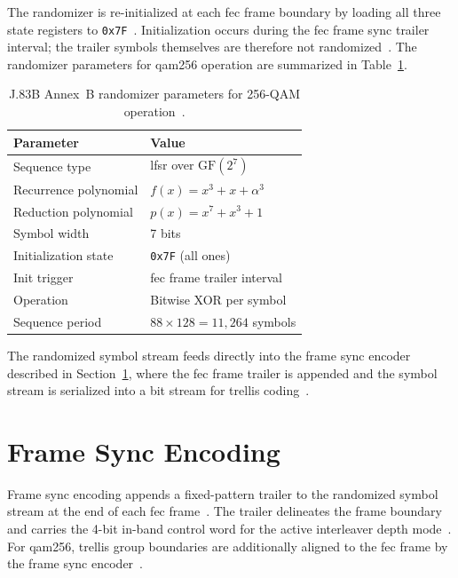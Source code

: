 The randomizer is re-initialized at each \ac{fec} frame boundary
by loading all three state registers to \texttt{0x7F}~\cite{ITU_J83}.
Initialization occurs during the \ac{fec} frame sync trailer
interval; the trailer symbols themselves are therefore not
randomized~\cite{ITU_J83}.
The randomizer parameters for \ac{qam256} operation are summarized
in Table~\ref{tab:rand_params}.

\begin{table}[htbp]
  \caption{J.83B Annex~B randomizer parameters for
           256-QAM operation~\cite{ITU_J83}.}
  \label{tab:rand_params}
  \centering
  \begin{tabular}{ll}
    \hline
    Parameter              & Value \\
    \hline
    Sequence type          & \ac{lfsr} over $\mathrm{GF}(2^7)$ \\
    Recurrence polynomial  & $f(x) = x^3 + x + \alpha^3$ \\
    Reduction polynomial   & $p(x) = x^7 + x^3 + 1$ \\
    Symbol width           & 7 bits \\
    Initialization state   & \texttt{0x7F} (all ones) \\
    Init trigger           & \ac{fec} frame trailer interval \\
    Operation              & Bitwise XOR per symbol \\
    Sequence period        & $88 \times 128 = 11{,}264$ symbols \\
    \hline
  \end{tabular}
\end{table}

The randomized symbol stream feeds directly into the frame sync
encoder described in Section~\ref{sec:framesync}, where the
\ac{fec} frame trailer is appended and the symbol stream is
serialized into a bit stream for trellis coding~\cite{ITU_J83}.


\section{Frame Sync Encoding}
\label{sec:framesync}

Frame sync encoding appends a fixed-pattern trailer to the
randomized symbol stream at the end of each \ac{fec}
frame~\cite{ITU_J83}.
The trailer delineates the frame boundary and carries the 4-bit
in-band control word for the active interleaver depth
mode~\cite{ITU_J83}.
For \ac{qam256}, trellis group boundaries are additionally aligned
to the \ac{fec} frame by the frame sync encoder~\cite{ITU_J83}.

